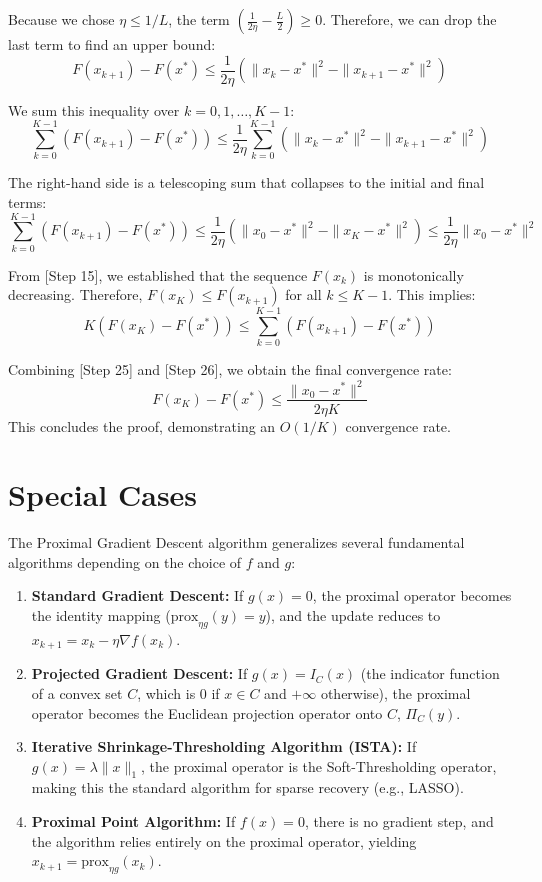 \documentclass[11pt]{article}
\begin{document}
\noindent [Step 23] Because we chose $\eta \le 1/L$, the term $\left(\frac{1}{2\eta} - \frac{L}{2}\right) \ge 0$. Therefore, we can drop the last term to find an upper bound:
$$F(x_{k+1}) - F(x^*) \le \frac{1}{2\eta}\left(\|x_k - x^*\|^2 - \|x_{k+1} - x^*\|^2\right)$$

\noindent [Step 24] We sum this inequality over $k = 0, 1, \dots, K-1$:
$$\sum_{k=0}^{K-1} (F(x_{k+1}) - F(x^*)) \le \frac{1}{2\eta} \sum_{k=0}^{K-1} \left(\|x_k - x^*\|^2 - \|x_{k+1} - x^*\|^2\right)$$

\noindent [Step 25] The right-hand side is a telescoping sum that collapses to the initial and final terms:
$$\sum_{k=0}^{K-1} (F(x_{k+1}) - F(x^*)) \le \frac{1}{2\eta} \left(\|x_0 - x^*\|^2 - \|x_K - x^*\|^2\right) \le \frac{1}{2\eta} \|x_0 - x^*\|^2$$

\noindent [Step 26] From [Step 15], we established that the sequence $F(x_k)$ is monotonically decreasing. Therefore, $F(x_K) \le F(x_{k+1})$ for all $k \le K-1$. This implies:
$$K(F(x_K) - F(x^*)) \le \sum_{k=0}^{K-1} (F(x_{k+1}) - F(x^*))$$

\noindent [Step 27] Combining [Step 25] and [Step 26], we obtain the final convergence rate:
$$F(x_K) - F(x^*) \le \frac{\|x_0 - x^*\|^2}{2\eta K}$$
This concludes the proof, demonstrating an $O(1/K)$ convergence rate.

\section*{Special Cases}
The Proximal Gradient Descent algorithm generalizes several fundamental algorithms depending on the choice of $f$ and $g$:
\begin{enumerate}
    \item \textbf{Standard Gradient Descent:} If $g(x) = 0$, the proximal operator becomes the identity mapping ($\text{prox}_{\eta g}(y) = y$), and the update reduces to $x_{k+1} = x_k - \eta \nabla f(x_k)$.
    \item \textbf{Projected Gradient Descent:} If $g(x) = I_C(x)$ (the indicator function of a convex set $C$, which is 0 if $x \in C$ and $+\infty$ otherwise), the proximal operator becomes the Euclidean projection operator onto $C$, $\Pi_C(y)$.
    \item \textbf{Iterative Shrinkage-Thresholding Algorithm (ISTA):} If $g(x) = \lambda \|x\|_1$, the proximal operator is the Soft-Thresholding operator, making this the standard algorithm for sparse recovery (e.g., LASSO).
    \item \textbf{Proximal Point Algorithm:} If $f(x) = 0$, there is no gradient step, and the algorithm relies entirely on the proximal operator, yielding $x_{k+1} = \text{prox}_{\eta g}(x_k)$.
\end{enumerate}
\end{document}
